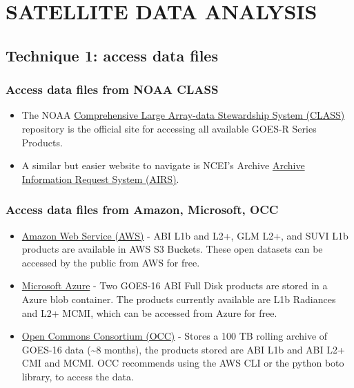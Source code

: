 \chapter{\normalsize{SATELLITE DATA ANALYSIS}}
\section{Technique 1: access data files}
\subsection{Access data files from NOAA CLASS}
\begin{itemize} 
\item The NOAA \href{https://www.avl.class.noaa.gov/saa/products/welcome}{Comprehensive Large Array-data Stewardship System (CLASS)} repository is the official site for accessing all available GOES-R Series Products.
\item  A similar but easier website to navigate is NCEI's Archive \href{https://www.ncdc.noaa.gov/airs-web/search}{Archive Information Request System (AIRS)}.
\end{itemize}
\subsection{Access data files from Amazon, Microsoft, OCC}
\begin{itemize}
\item \href{https://registry.opendata.aws/noaa-goes/}{Amazon Web Service (AWS)} - ABI L1b and L2+, GLM L2+, and SUVI L1b products are available in AWS S3 Buckets. These open datasets can be accessed by the public from AWS for free. 
\item \href{https://azure.microsoft.com/en-us/services/open-datasets/catalog/goes-16/}{Microsoft Azure}  - Two GOES-16 ABI Full Disk products are stored in a Azure blob container. 
The products currently available are L1b Radiances and L2+ MCMI, which can be accessed from Azure for free.
\item  \href{http://edc.occ-data.org/goes16/}{Open Commons Consortium (OCC)} - Stores a 100 TB rolling archive of GOES-16 data (\~{}8 months), the products stored are ABI L1b and ABI L2+ CMI and MCMI. OCC recommends using the AWS CLI or the python boto library, to access the data. 
\end{itemize}
